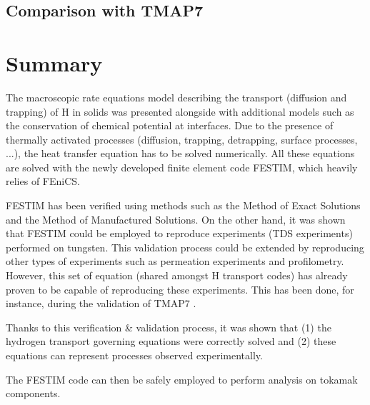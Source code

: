 \subsection{Comparison with TMAP7}



\section{Summary}

The macroscopic rate equations model describing the transport (diffusion and trapping) of H in solids was presented alongside with additional models such as the conservation of chemical potential at interfaces.
Due to the presence of thermally activated processes (diffusion, trapping, detrapping, surface processes, ...), the heat transfer equation has to be solved numerically.
All these equations are solved with the newly developed finite element code FESTIM, which heavily relies of FEniCS.

FESTIM has been verified using methods such as the Method of Exact Solutions and the Method of Manufactured Solutions.
On the other hand, it was shown that FESTIM could be employed to reproduce experiments (TDS experiments) performed on tungsten.
This validation process could be extended by reproducing other types of experiments such as permeation experiments and profilometry.
However, this set of equation (shared amongst H transport codes) has already proven to be capable of reproducing these experiments.
This has been done, for instance, during the validation of TMAP7 .

Thanks to this verification \& validation process, it was shown that (1) the hydrogen transport governing equations were correctly solved and (2) these equations can represent processes observed experimentally.

The FESTIM code can then be safely employed to perform analysis on tokamak components.
